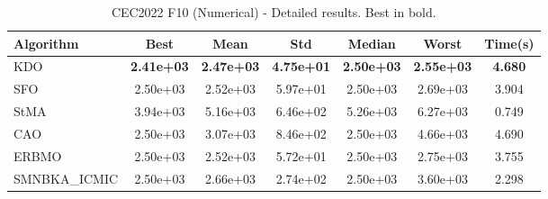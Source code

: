 \begin{table}[H]
\centering\small
\caption{CEC2022 F10 (Numerical) - Detailed results. Best in bold.}
\label{tab:cec2022_F10}
\begin{tabular}{lcccccc}
\toprule
\textbf{Algorithm} & \textbf{Best} & \textbf{Mean} & \textbf{Std} & \textbf{Median} & \textbf{Worst} & \textbf{Time(s)} \\
\midrule
KDO & \textbf{2.41e+03} & \textbf{2.47e+03} & \textbf{4.75e+01} & \textbf{2.50e+03} & \textbf{2.55e+03} & \textbf{4.680} \\
SFO & 2.50e+03 & 2.52e+03 & 5.97e+01 & 2.50e+03 & 2.69e+03 & 3.904 \\
StMA & 3.94e+03 & 5.16e+03 & 6.46e+02 & 5.26e+03 & 6.27e+03 & 0.749 \\
CAO & 2.50e+03 & 3.07e+03 & 8.46e+02 & 2.50e+03 & 4.66e+03 & 4.690 \\
ERBMO & 2.50e+03 & 2.52e+03 & 5.72e+01 & 2.50e+03 & 2.75e+03 & 3.755 \\
SMNBKA_ICMIC & 2.50e+03 & 2.66e+03 & 2.74e+02 & 2.50e+03 & 3.60e+03 & 2.298 \\
\bottomrule
\end{tabular}
\end{table}
